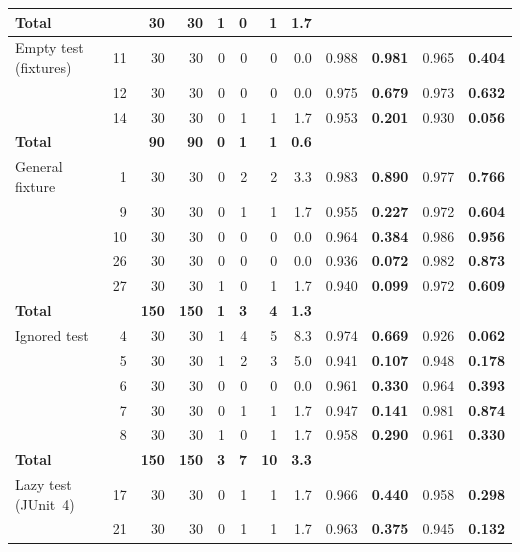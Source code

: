 \begin{xltabular}{\linewidth}{l r r r r r r r r r r r}
    \textbf{Total} & & \textbf{30} & \textbf{30} & \textbf{1} & \textbf{0} & \textbf{1} & \textbf{1.7} & & & & \\
  \midrule
    Empty test (fixtures) & 11 & 30 & 30 & 0 & 0 & 0 & 0.0 & 0.988 & \textbf{0.981} & 0.965 & \textbf{0.404} \\
     & 12 & 30 & 30 & 0 & 0 & 0 & 0.0 & 0.975 & \textbf{0.679} & 0.973 & \textbf{0.632} \\
     & 14 & 30 & 30 & 0 & 1 & 1 & 1.7 & 0.953 & \textbf{0.201} & 0.930 & \textbf{0.056} \\
    \textbf{Total} & & \textbf{90} & \textbf{90} & \textbf{0} & \textbf{1} & \textbf{1} & \textbf{0.6} & & & & \\
  \midrule
    General fixture & 1 & 30 & 30 & 0 & 2 & 2 & 3.3 & 0.983 & \textbf{0.890} & 0.977 & \textbf{0.766} \\
     & 9 & 30 & 30 & 0 & 1 & 1 & 1.7 & 0.955 & \textbf{0.227} & 0.972 & \textbf{0.604} \\
     & 10 & 30 & 30 & 0 & 0 & 0 & 0.0 & 0.964 & \textbf{0.384} & 0.986 & \textbf{0.956} \\
     & 26 & 30 & 30 & 0 & 0 & 0 & 0.0 & 0.936 & \textbf{0.072} & 0.982 & \textbf{0.873} \\
     & 27 & 30 & 30 & 1 & 0 & 1 & 1.7 & 0.940 & \textbf{0.099} & 0.972 & \textbf{0.609} \\
    \textbf{Total} & & \textbf{150} & \textbf{150} & \textbf{1} & \textbf{3} & \textbf{4} & \textbf{1.3} & & & & \\
  \midrule
    Ignored test & 4 & 30 & 30 & 1 & 4 & 5 & 8.3 & 0.974 & \textbf{0.669} & 0.926 & \textbf{0.062} \\
     & 5 & 30 & 30 & 1 & 2 & 3 & 5.0 & 0.941 & \textbf{0.107} & 0.948 & \textbf{0.178} \\
     & 6 & 30 & 30 & 0 & 0 & 0 & 0.0 & 0.961 & \textbf{0.330} & 0.964 & \textbf{0.393} \\
     & 7 & 30 & 30 & 0 & 1 & 1 & 1.7 & 0.947 & \textbf{0.141} & 0.981 & \textbf{0.874} \\
     & 8 & 30 & 30 & 1 & 0 & 1 & 1.7 & 0.958 & \textbf{0.290} & 0.961 & \textbf{0.330} \\
    \textbf{Total} & & \textbf{150} & \textbf{150} & \textbf{3} & \textbf{7} & \textbf{10} & \textbf{3.3} & & & & \\
  \midrule
    Lazy test (JUnit~4) & 17 & 30 & 30 & 0 & 1 & 1 & 1.7 & 0.966 & \textbf{0.440} & 0.958 & \textbf{0.298} \\
     & 21 & 30 & 30 & 0 & 1 & 1 & 1.7 & 0.963 & \textbf{0.375} & 0.945 & \textbf{0.132} \\

\end{xltabular}
